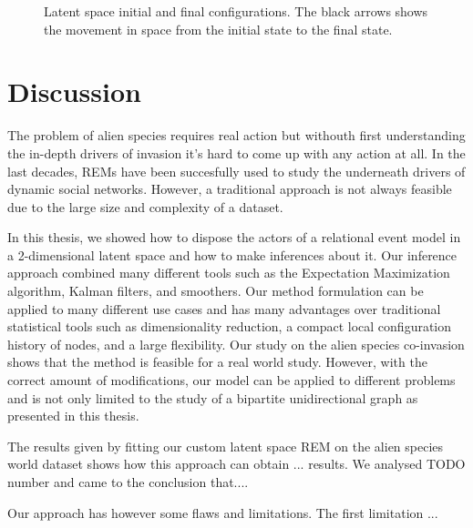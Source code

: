 \documentclass[mscthesis]{usiinfthesis}
\begin{document}
\begin{figure}[ht]
\begin{minipage}[b]{0.5\linewidth}
    \vspace{4ex}
  \end{minipage}  
\caption{Latent space initial and final configurations. The black arrows shows the movement in space from the initial state to the final state.}
\label{fig:latentspace_cluster}
\end{figure}







\chapter{Discussion}

The problem of alien species requires real action but withouth first understanding the in-depth drivers of invasion it's hard to come up with any action at all. In the last decades, REMs have been succesfully used to study the underneath drivers of dynamic social networks. However, a traditional approach is not always feasible due to the large size and complexity of a dataset.

In this thesis, we showed how to dispose the actors of a relational event model in a 2-dimensional latent space and how to make inferences about it. Our inference approach combined many different tools such as the Expectation Maximization algorithm, Kalman filters, and smoothers. Our method formulation can be applied to many different use cases and has many advantages over traditional statistical tools such as dimensionality reduction, a compact local configuration history of nodes, and a large flexibility. Our study on the alien species co-invasion shows that the method is feasible for a real world study. However, with the correct amount of modifications, our model can be applied to different problems and is not only limited to the study of a bipartite unidirectional graph as presented in this thesis. 

The results given by fitting our custom latent space REM on the alien species world dataset shows how this approach can obtain ... results. We analysed TODO number and came to the conclusion that....

Our approach has however some flaws and limitations. The first limitation ...

\end{document}
